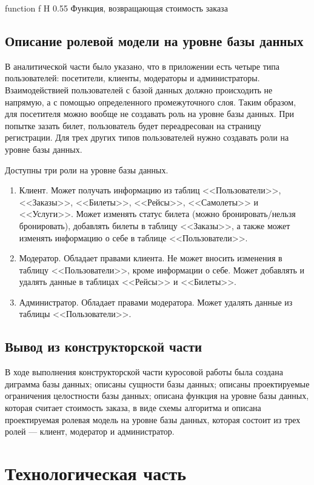 \documentclass{bmstu}
\begin{document}
    {function}
    {f}
    {H}
    {0.55\textwidth}
    {Функция, возвращающая стоимость заказа}

\section{Описание ролевой модели на уровне базы данных}

В аналитической части было указано, что в приложении есть четыре типа пользователей: посетители, клиенты, модераторы и администраторы. 
Взаимодействией пользователей с базой данных должно происходить не напрямую, а с помощью определенного промежуточного слоя. 
Таким образом, для посетителя можно вообще не создавать роль на уровне базы данных. 
При попытке зазать билет, пользователь будет переадресован на страницу регистрации. 
Для трех других типов пользователей нужно создавать роли на уровне базы данных.

Доступны три роли на уровне базы данных.
\begin{enumerate}
\item Клиент. 
Может получать информацию из таблиц <<Пользователи>>, <<Заказы>>, <<Билеты>>, <<Рейсы>>, <<Самолеты>> и <<Услуги>>. 
Может изменять статус билета (можно бронировать/нельзя бронировать), добавлять билеты в таблицу <<Заказы>>, а также может изменять информацию о себе в таблице <<Пользователи>>.
\item Модератор. 
Обладает правами клиента. 
Не может вносить изменения в таблицу <<Пользователи>>, кроме информации о себе. 
Может добавлять и удалять данные в таблицах <<Рейсы>> и <<Билеты>>.
\item Администратор. 
Обладает правами модератора.
Может удалять данные из таблицы <<Пользователи>>.
\end{enumerate}

\section*{Вывод из конструкторской части}

В ходе выполнения конструкторской части куросовой работы была создана диграмма базы данных; описаны сущности базы данных; описаны проектируемые ограничения целостности базы данных; описана функция на уровне базы данных, которая считает стоимость заказа, в виде схемы алгоритма и описана проектируемая ролевая модель на уровне базы данных, которая состоит из трех ролей --- клиент, модератор и администратор.

\chapter{Технологическая часть}
\end{document}
